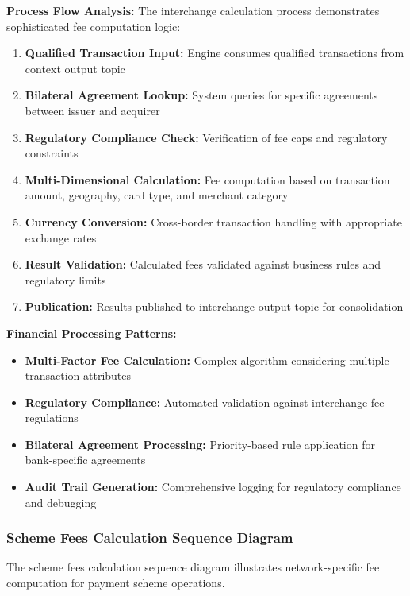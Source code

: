 \textbf{Process Flow Analysis:}
The interchange calculation process demonstrates sophisticated fee computation logic:

\begin{enumerate}
    \item \textbf{Qualified Transaction Input:} Engine consumes qualified transactions from context output topic
    \item \textbf{Bilateral Agreement Lookup:} System queries for specific agreements between issuer and acquirer
    \item \textbf{Regulatory Compliance Check:} Verification of fee caps and regulatory constraints
    \item \textbf{Multi-Dimensional Calculation:} Fee computation based on transaction amount, geography, card type, and merchant category
    \item \textbf{Currency Conversion:} Cross-border transaction handling with appropriate exchange rates
    \item \textbf{Result Validation:} Calculated fees validated against business rules and regulatory limits
    \item \textbf{Publication:} Results published to interchange output topic for consolidation
\end{enumerate}

\textbf{Financial Processing Patterns:}
\begin{itemize}
    \item \textbf{Multi-Factor Fee Calculation:} Complex algorithm considering multiple transaction attributes
    \item \textbf{Regulatory Compliance:} Automated validation against interchange fee regulations
    \item \textbf{Bilateral Agreement Processing:} Priority-based rule application for bank-specific agreements
    \item \textbf{Audit Trail Generation:} Comprehensive logging for regulatory compliance and debugging
\end{itemize}

\subsubsection{Scheme Fees Calculation Sequence Diagram}

The scheme fees calculation sequence diagram illustrates network-specific fee computation for payment scheme operations.

